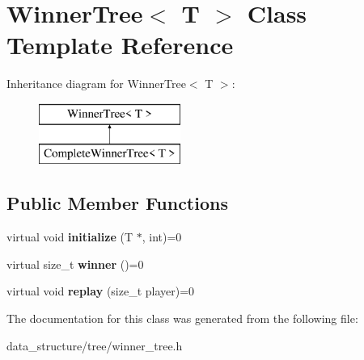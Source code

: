 \hypertarget{classWinnerTree}{}\section{Winner\+Tree$<$ T $>$ Class Template Reference}
\label{classWinnerTree}
Inheritance diagram for Winner\+Tree$<$ T $>$\+:\begin{figure}[H]
\begin{center}
\leavevmode
\includegraphics[height=2.000000cm]{classWinnerTree}
\end{center}
\end{figure}
\subsection*{Public Member Functions}
\begin{DoxyCompactItemize}
\item 
\mbox{\label{classWinnerTree_af1065e5749f146aa8e8e2321f2c62bbd}} 
virtual void {\bfseries initialize} (T $\ast$, int)=0
\item 
\mbox{\label{classWinnerTree_a29bc74be01f7bb92452248e7dc2e02cb}} 
virtual size\+\_\+t {\bfseries winner} ()=0
\item 
\mbox{\label{classWinnerTree_a230bbd5dfd5a8a184bddc2e5937ceba3}} 
virtual void {\bfseries replay} (size\+\_\+t player)=0
\end{DoxyCompactItemize}


The documentation for this class was generated from the following file\+:\begin{DoxyCompactItemize}
\item 
data\+\_\+structure/tree/winner\+\_\+tree.\+h\end{DoxyCompactItemize}
